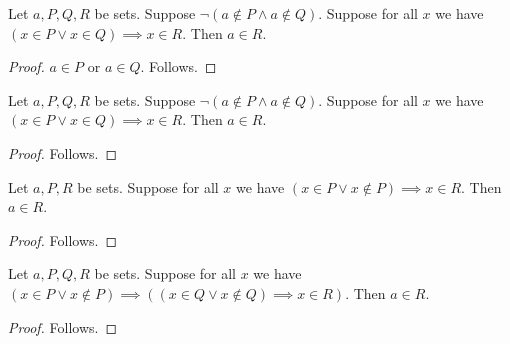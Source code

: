 \begin{proposition}\label{explicit_demorgan_premise}
    Let $a,P,Q,R$ be sets.
    Suppose $\lnot(a\notin P\land a\notin Q)$.
    Suppose for all $x$ we have $(x\in P\lor x\in Q)\implies x\in R$.
    Then $a\in R$.
\end{proposition}
\begin{proof}
    $a\in P$ or $a\in Q$.
    Follows.
\end{proof}

\begin{proposition}\label{obvious_demorgan_premise}
    Let $a,P,Q,R$ be sets.
    Suppose $\lnot(a\notin P\land a\notin Q)$.
    Suppose for all $x$ we have $(x\in P\lor x\in Q)\implies x\in R$.
    Then $a\in R$.
\end{proposition}
\begin{proof}
    Follows.
\end{proof}

\begin{proposition}\label{obvious_excluded_middle_premise}
    Let $a,P,R$ be sets.
    Suppose for all $x$ we have $(x\in P\lor x\notin P)\implies x\in R$.
    Then $a\in R$.
\end{proposition}
\begin{proof}
    Follows.
\end{proof}

\begin{proposition}\label{obvious_two_boolean_premises}
    Let $a,P,Q,R$ be sets.
    Suppose for all $x$ we have $(x\in P\lor x\notin P)\implies
        ((x\in Q\lor x\notin Q)\implies x\in R)$.
    Then $a\in R$.
\end{proposition}
\begin{proof}
    Follows.
\end{proof}
